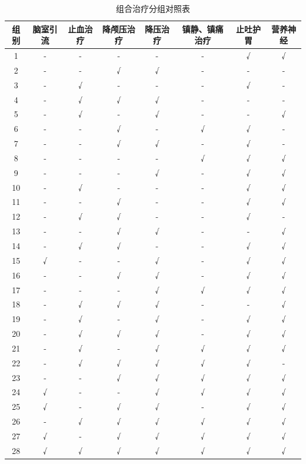 \documentclass[bwprint]{gmcmthesis}
\begin{document}
\begin{table}[!ht]
    \centering
    
    \begin{spacing}{0.6}
    \caption{组合治疗分组对照表}
    \label{组合治疗分组对照表}
    \begin{tabular}{cccccccc}
    \toprule[1.5pt]   %
        \small{组别} & \small{脑室引流} & \small{止血治疗} & \small{降颅压治疗} & \small{降压治疗} & \small{镇静、镇痛治疗} & \small{止吐护胃} & {营养神经} \\ 
        \midrule[1pt]
        1 & - & - & - & - & - & √ & √ \\ 
        2 & - & - & √ & √ & - & - & - \\ 
        3 & - & √ & - & - & - & √ & - \\ 
        4 & - & √ & √ & √ & - & - & - \\ 
        5 & - & √ & - & √ & - & - & √ \\ 
        6 & - & - & √ & - & √ & √ & - \\ 
        7 & - & - & √ & √ & - & √ & - \\ 
        8 & - & - & - & - & √ & √ & √ \\ 
        9 & - & - & - & √ & - & √ & √ \\ 
        10 & - & √ & - & - & - & √ & √ \\ 
        11 & - & - & √ & - & - & √ & √ \\ 
        12 & - & √ & √ & - & - & √ & - \\ 
        13 & - & - & √ & √ & - & - & √ \\ 
        14 & - & √ & √ & - & - & √ & √ \\ 
        15 & √ & - & - & √ & - & √ & √ \\ 
        16 & - & - & √ & √ & - & √ & √ \\ 
        17 & - & - & - & √ & √ & √ & √ \\ 
        18 & - & √ & √ & √ & - & - & √ \\ 
        19 & - & √ & - & √ & - & √ & √ \\ 
        20 & - & √ & √ & √ & - & √ & √ \\ 
        21 & - & √ & - & √ & √ & √ & √ \\ 
        22 & - & √ & √ & √ & √ & √ & - \\ 
        23 & - & - & √ & √ & √ & √ & √ \\ 
        24 & √ & - & - & √ & √ & √ & √ \\ 
        25 & √ & - & √ & √ & - & √ & √ \\ 
        26 & - & √ & √ & √ & √ & √ & √ \\ 
        27 & √ & - & √ & √ & √ & √ & √ \\ 
        28 & √ & √ & √ & √ & √ & √ & √ \\ 
        \bottomrule[1.5pt] 
    \end{tabular}
    \end{spacing}
    
\end{table}
\end{document}
